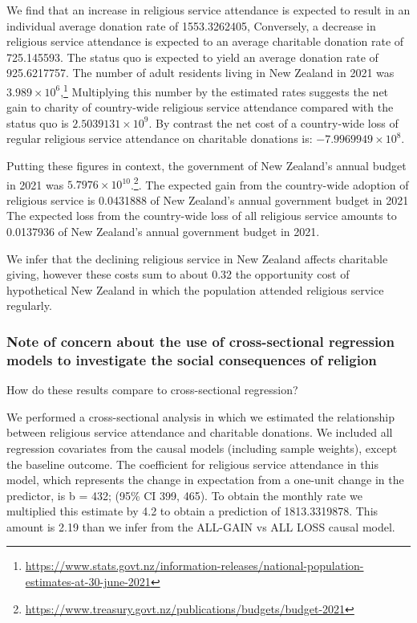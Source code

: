 \documentclass[
  single column]{article}
\begin{document}
We find that an increase in religious service attendance is expected to
result in an individual average donation rate of 1553.3262405,
Conversely, a decrease in religious service attendance is expected to an
average charitable donation rate of 725.145593. The status quo is
expected to yield an average donation rate of 925.6217757. The number of
adult residents living in New Zealand in 2021 was
\ensuremath{3.989\times 10^{6}},\footnote{\url{https://www.stats.govt.nz/information-releases/national-population-estimates-at-30-june-2021}}
Multiplying this number by the estimated rates suggests the net gain to
charity of country-wide religious service attendance compared with the
status quo is \ensuremath{2.5039131\times 10^{9}}. By contrast the net
cost of a country-wide loss of regular religious service attendance on
charitable donations is: \ensuremath{-7.9969949\times 10^{8}}.

Putting these figures in context, the government of New Zealand's annual
budget in 2021 was \ensuremath{5.7976\times 10^{10}}.\footnote{\url{https://www.treasury.govt.nz/publications/budgets/budget-2021}}.
The expected gain from the country-wide adoption of religious service is
0.0431888 of New Zealand's annual government budget in 2021 The expected
loss from the country-wide loss of all religious service amounts to
0.0137936 of New Zealand's annual government budget in 2021.

We infer that the declining religious service in New Zealand affects
charitable giving, however these costs sum to about 0.32 the opportunity
cost of hypothetical New Zealand in which the population attended
religious service regularly.

\subsubsection{Note of concern about the use of cross-sectional
regression models to investigate the social consequences of
religion}\label{note-of-concern-about-the-use-of-cross-sectional-regression-models-to-investigate-the-social-consequences-of-religion}

How do these results compare to cross-sectional regression?

We performed a cross-sectional analysis in which we estimated the
relationship between religious service attendance and charitable
donations. We included all regression covariates from the causal models
(including sample weights), except the baseline outcome. The coefficient
for religious service attendance in this model, which represents the
change in expectation from a one-unit change in the predictor, is b =
432; (95\% CI 399, 465). To obtain the monthly rate we multiplied this
estimate by 4.2 to obtain a prediction of 1813.3319878. This amount is
2.19 than we infer from the ALL-GAIN vs ALL LOSS causal model.
\end{document}
